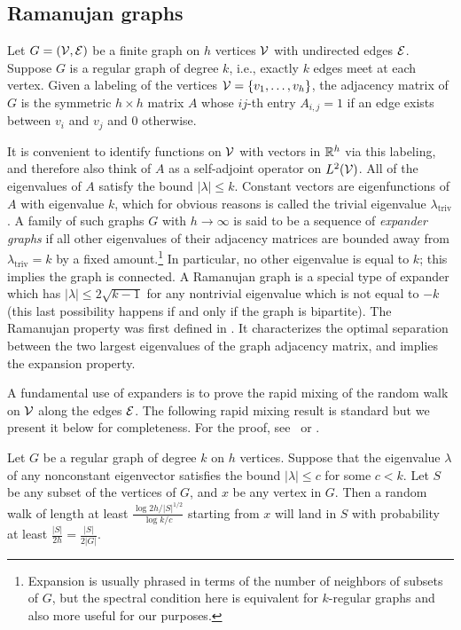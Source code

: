 \subsection{Ramanujan graphs}\label{ram_graph} 

Let $G = (\mathcal{V},{\mathcal{E}})$ be a finite graph on $h$ vertices ${\mathcal{V}}$
with undirected edges ${\mathcal{E}}$.  Suppose $G$ is a regular graph of degree
$k$, i.e., exactly $k$ edges meet at each vertex. Given a
labeling of the vertices ${\mathcal{V}} = \{v_1,\ldots , v_h\}$, the adjacency
matrix of $G$ is the symmetric $h\times h$ matrix $A$ whose $ij$-th
entry $A_{i,j} = 1$ if an edge exists between $v_i$ and $v_j$ and 0
otherwise.

It is convenient to identify functions on ${\mathcal{V}}$ with vectors in
${\mathbb{R}}^h$ via this labeling, and therefore also think of $A$ as a
self-adjoint operator on $L^2({\mathcal{V}})$.  All of the eigenvalues of $A$
satisfy the bound $|\lambda| \leq k$. Constant vectors are
eigenfunctions of $A$ with eigenvalue $k$, which for obvious reasons
is called the trivial eigenvalue $\lambda_{\operatorname{triv}}$. A
family of such graphs $G$ with $h \rightarrow \infty$ is said to be a
sequence of \emph{expander graphs} if all other eigenvalues of their
adjacency matrices are bounded away from
$\lambda_{\operatorname{triv}}= k$ by a fixed
amount.\footnote{Expansion is usually phrased in terms of the number
  of neighbors of subsets of $G$, but the spectral condition here is
  equivalent for $k$-regular graphs and also more useful for our
  purposes.}  In particular, no other eigenvalue is equal to $k$; this
implies the graph is connected.  A Ramanujan graph is a special type
of expander which has $|\lambda| \leq 2\sqrt{k-1}$ for any nontrivial
eigenvalue which is not equal to $-k$ (this last possibility happens
if and only if the graph is bipartite). The Ramanujan property was
first defined in \cite{LubPS}. It characterizes the optimal separation
between the two largest eigenvalues of the graph adjacency matrix, and
implies the expansion property.

A fundamental use of expanders is to prove the rapid mixing of the
random walk on ${\mathcal{V}}$ along the edges ${\mathcal{E}}$. The following rapid mixing
result is standard but we present it below for completeness. For the
proof, see~\cite{JMV} or \cite{DSV,Lub,Sarnak}.

\begin{prop}\label{prop:mixing} Let $G$ be a regular graph of degree
  $k$ on $h$ vertices. Suppose that the eigenvalue $\lambda$ of any
  nonconstant eigenvector satisfies the bound $|\lambda| \leq c$ for
  some $c < k$. Let $S$ be any subset of the vertices of $G$, and $x$
  be any vertex in $G$. Then a random walk of length at least
  $\frac{\log 2h/|S|^{1/2}}{\log k/c}$ starting from $x$ will land in
  $S$ with probability at least $\frac{|S|}{2h} = \frac{|S|}{2|G|}$.
\end{prop}

